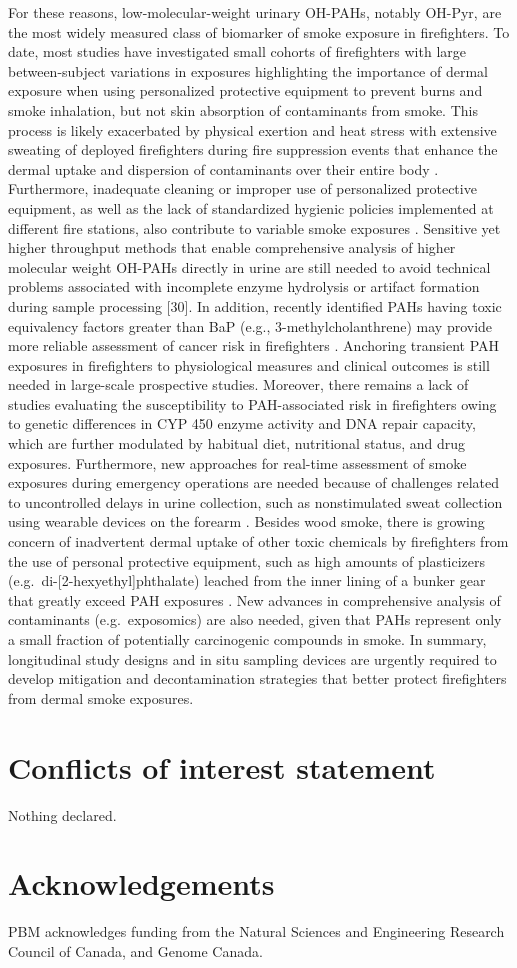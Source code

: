 \documentclass[preprint, 3p,
authoryear]{elsarticle} %
\begin{document}
For these reasons, low-molecular-weight urinary OH-PAHs, notably OH-Pyr,
are the most widely measured class of biomarker of smoke exposure in
firefighters. To date, most studies have investigated small cohorts of
firefighters with large between-subject variations in exposures
highlighting the importance of dermal exposure when using personalized
protective equipment to prevent burns and smoke inhalation, but not skin
absorption of contaminants from smoke. This process is likely
exacerbated by physical exertion and heat stress with extensive sweating
of deployed firefighters during fire suppression events that enhance the
dermal uptake and dispersion of contaminants over their entire body
\citep{12}. Furthermore, inadequate cleaning or improper use of
personalized protective equipment, as well as the lack of standardized
hygienic policies implemented at different fire stations, also
contribute to variable smoke exposures \citep{3}. Sensitive yet higher
throughput methods that enable comprehensive analysis of higher
molecular weight OH-PAHs directly in urine are still needed to avoid
technical problems associated with incomplete enzyme hydrolysis or
artifact formation during sample processing {[}30{]}. In addition,
recently identified PAHs having toxic equivalency factors greater than
BaP (e.g., 3-methylcholanthrene) may provide more reliable assessment of
cancer risk in firefighters \citep{48}. Anchoring transient PAH
exposures in firefighters to physiological measures and clinical
outcomes is still needed in large-scale prospective studies. Moreover,
there remains a lack of studies evaluating the susceptibility to
PAH-associated risk in firefighters owing to genetic differences in CYP
450 enzyme activity and DNA repair capacity, which are further modulated
by habitual diet, nutritional status, and drug exposures. Furthermore,
new approaches for real-time assessment of smoke exposures during
emergency operations are needed because of challenges related to
uncontrolled delays in urine collection, such as nonstimulated sweat
collection using wearable devices on the forearm \citep{49}. Besides
wood smoke, there is growing concern of inadvertent dermal uptake of
other toxic chemicals by firefighters from the use of personal
protective equipment, such as high amounts of plasticizers
(e.g.~di-{[}2-hexyethyl{]}phthalate) leached from the inner lining of a
bunker gear that greatly exceed PAH exposures \citep{50}. New advances
in comprehensive analysis of contaminants (e.g.~exposomics) are also
needed, given that PAHs represent only a small fraction of potentially
carcinogenic compounds in smoke. In summary, longitudinal study designs
and in situ sampling devices are urgently required to develop mitigation
and decontamination strategies that better protect firefighters from
dermal smoke exposures.

\section{Conflicts of interest
statement}\label{conflicts-of-interest-statement}

Nothing declared.

\section{Acknowledgements}\label{acknowledgements}

PBM acknowledges funding from the Natural Sciences and Engineering
Research Council of Canada, and Genome Canada.


\end{document}
